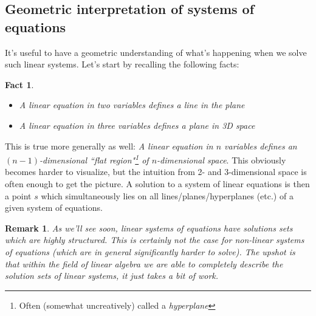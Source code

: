 \documentclass[12pt]{article}
\numberwithin{equation}{subsection}
\numberwithin{figure}{subsection}
\newtheorem{fact}[subsection]{Fact}
\theoremstyle{note}
\newtheorem{remark}[subsection]{Remark}
\begin{document}
\subsection{Geometric interpretation of systems of equations}
It's useful to have a geometric understanding of what's happening when we solve such linear systems. Let's start by recalling the following facts:
\begin{fact}$~$
	\begin{itemize}
		\item A linear equation in two variables defines a line in the plane
		\item A linear equation in three variables defines a plane in 3D space
	\end{itemize}
\end{fact}
This is true more generally as well: \textit{A linear equation in $n$ variables defines an $(n-1)$-dimensional ``flat region"\footnote{Often (somewhat uncreatively) called a \textit{hyperplane}} of $n$-dimensional space}. This obviously becomes harder to visualize, but the intuition from 2- and 3-dimensional space is often enough to get the picture. A solution to a system of linear equations is then a point $s$ which simultaneously lies on all lines/planes/hyperplanes (etc.) of a given system of equations. 

\begin{remark}As we'll see soon, \textit{linear} systems of equations have solutions sets which are highly structured. This is certainly not the case for \textit{non-linear} systems of equations (which are in general significantly harder to solve). The upshot is that within the field of linear algebra we are able to \textit{completely} describe the solution sets of linear systems, it just takes a bit of work. \end{remark}
\end{document}

